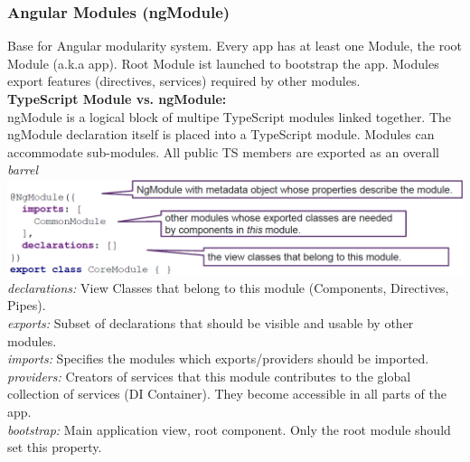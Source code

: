 \subsubsection{Angular Modules (ngModule)}
Base for Angular modularity system. Every app has at least one Module, the root Module (a.k.a app).
Root Module ist launched to bootstrap the app.
Modules export features (directives, services) required by other modules.\\
\textbf{TypeScript Module vs. ngModule:}\\
ngModule is a logical block of multipe TypeScript modules linked together.
The ngModule declaration itself is placed into a TypeScript module.
Modules can accommodate sub-modules. All public TS members are exported as an overall \textit{barrel}
\includegraphics[width=\linewidth]{img/angular_module_declaration.png}
\textit{declarations:} View Classes that belong to this module (Components, Directives, Pipes).\\
\textit{exports:} Subset of declarations that should be visible and usable by other modules.\\
\textit{imports:} Specifies the modules which exports/providers should be imported.\\
\textit{providers:} Creators of services that this module contributes to the global collection of services (DI Container).
They become accessible in all parts of the app.\\
\textit{bootstrap:} Main application view, root component. Only the root module should set this property.

